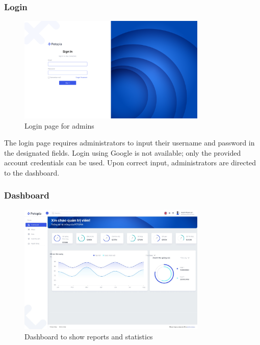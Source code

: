 \subsubsection{Login}

\begin{figure}[H]
    \centering
    \includegraphics[width=0.8\textwidth]{Figures/login_bo_ui.png}
    \caption{Login page for admins}
\end{figure}

The login page requires administrators to input their username and password in the designated fields. Login using Google is not available; only the provided account credentials can be used. Upon correct input, administrators are directed to the dashboard.

\subsubsection{Dashboard}

\begin{figure}[H]
    \centering
    \includegraphics[width=0.8\textwidth]{Figures/dashboard_ui.jpg}
    \caption{Dashboard to show reports and statistics}
\end{figure}

